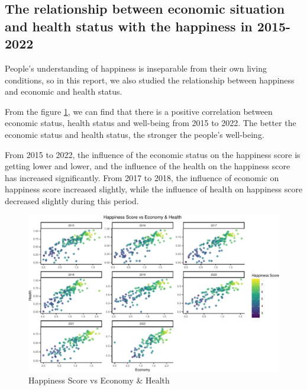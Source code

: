 \documentclass[11pt,a4paper,]{article}
\begin{document}
\hypertarget{the-relationship-between-economic-situation-and-health-status-with-the-happiness-in-2015-2022}{%
\subsection{The relationship between economic situation and health status with the happiness in 2015-2022}\label{the-relationship-between-economic-situation-and-health-status-with-the-happiness-in-2015-2022}}

People's understanding of happiness is inseparable from their own living conditions, so in this report, we also studied the relationship between happiness and economic and health status.

From the figure \ref{fig:VS}, we can find that there is a positive correlation between economic status, health status and well-being from 2015 to 2022. The better the economic status and health status, the stronger the people's well-being.

From 2015 to 2022, the influence of the economic status on the happiness score is getting lower and lower, and the influence of the health on the happiness score has increased significantly. From 2017 to 2018, the influence of economic on happiness score increased slightly, while the influence of health on happiness score decreased slightly during this period.

\begin{figure}
\centering
\includegraphics{Assignment4_files/figure-latex/VS-1.pdf}
\caption{\label{fig:VS}Happiness Score vs Economy \& Health}
\end{figure}
\end{document}
